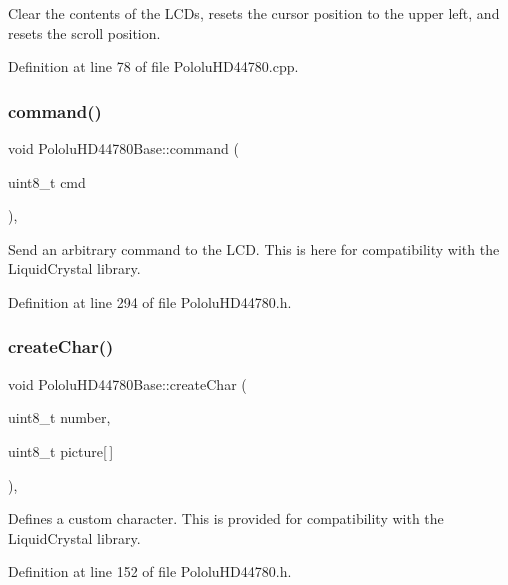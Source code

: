 Clear the contents of the L\+C\+Ds, resets the cursor position to the upper left, and resets the scroll position. 

Definition at line 78 of file Pololu\+H\+D44780.\+cpp.

\mbox{\label{class_pololu_h_d44780_base_a449ad8d9ff7afb90667da0003a39af3b}} 
\subsubsection{\texorpdfstring{command()}{command()}}
{\footnotesize\ttfamily void Pololu\+H\+D44780\+Base\+::command (\begin{DoxyParamCaption}\item[{uint8\+\_\+t}]{cmd }\end{DoxyParamCaption})\hspace{0.3cm}{\ttfamily [inline]}, {\ttfamily [inherited]}}

Send an arbitrary command to the L\+CD. This is here for compatibility with the Liquid\+Crystal library. 

Definition at line 294 of file Pololu\+H\+D44780.\+h.

\mbox{\label{class_pololu_h_d44780_base_afd802cdc57783830acfe2415355d9f09}} 
\subsubsection{\texorpdfstring{create\+Char()}{createChar()}}
{\footnotesize\ttfamily void Pololu\+H\+D44780\+Base\+::create\+Char (\begin{DoxyParamCaption}\item[{uint8\+\_\+t}]{number,  }\item[{uint8\+\_\+t}]{picture\mbox{[}$\,$\mbox{]} }\end{DoxyParamCaption})\hspace{0.3cm}{\ttfamily [inline]}, {\ttfamily [inherited]}}

Defines a custom character. This is provided for compatibility with the Liquid\+Crystal library. 

Definition at line 152 of file Pololu\+H\+D44780.\+h.

